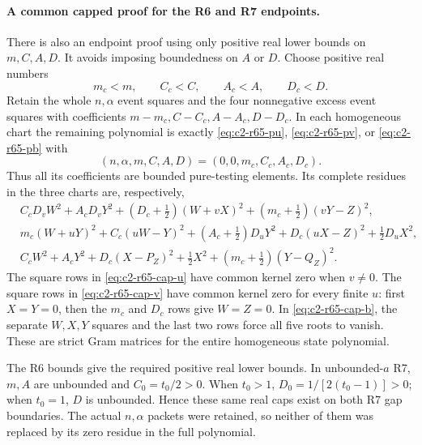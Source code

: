 \paragraph{A common capped proof for the R6 and R7 endpoints.}
There is also an endpoint proof using only positive real lower bounds
on $m,C,A,D$. It avoids imposing boundedness on $A$ or $D$.
Choose positive real numbers
\[
 m_c<m,\qquad C_c<C,\qquad A_c<A,\qquad D_c<D.
\]
Retain the whole $n,\alpha$ event squares and the four nonnegative
excess event squares with coefficients
$m-m_c,C-C_c,A-A_c,D-D_c$. In each homogeneous chart the remaining
polynomial is exactly \eqref{eq:c2-r65-pu},
\eqref{eq:c2-r65-pv}, or \eqref{eq:c2-r65-pb} with
\[
 (n,\alpha,m,C,A,D)=(0,0,m_c,C_c,A_c,D_c).
\]
Thus all its coefficients are bounded pure-testing elements. Its
complete residues in the three charts are, respectively,
\begin{align}
 &C_cD_vW^2+A_cD_vY^2+(D_c+\tfrac12)(W+vX)^2
                   +(m_c+\tfrac12)(vY-Z)^2,
                         \label{eq:c2-r65-cap-u}\\
 &m_c(W+uY)^2+C_c(uW-Y)^2+(A_c+\tfrac12)D_uY^2
                   +D_c(uX-Z)^2+\tfrac12D_uX^2,
                         \label{eq:c2-r65-cap-v}\\
 &C_cW^2+A_cY^2+D_c(X-P_Z)^2+\tfrac12X^2
                   +(m_c+\tfrac12)(Y-Q_Z)^2.
                         \label{eq:c2-r65-cap-b}
\end{align}
The square rows in \eqref{eq:c2-r65-cap-u} have common kernel zero
when $v\ne0$. The square rows in \eqref{eq:c2-r65-cap-v} have
common kernel zero for every finite $u$: first $X=Y=0$, then the
$m_c$ and $D_c$ rows give $W=Z=0$. In
\eqref{eq:c2-r65-cap-b}, the separate $W,X,Y$ squares and the last
two rows force all five roots to vanish. These are strict Gram
matrices for the entire homogeneous state polynomial.

The R6 bounds give the required positive real lower bounds. In
unbounded-$a$ R7, $m,A$ are unbounded and $C_0=t_0/2>0$.
When $t_0>1$, $D_0=1/[2(t_0-1)]>0$; when $t_0=1$, $D$ is
unbounded. Hence these same real caps exist on both R7 gap
boundaries. The actual $n,\alpha$ packets were retained, so neither
of them was replaced by its zero residue in the full polynomial.

